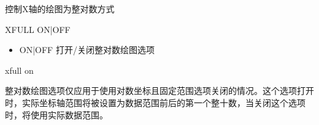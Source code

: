 \label{cmd:xfull}

控制X轴的绘图为整对数方式

\begin{SACSTX}
XFULL ON|OFF
\end{SACSTX}

\begin{itemize}
\item ON|OFF 打开/关闭整对数绘图选项
\end{itemize}

\begin{SACDFT}
xfull on
\end{SACDFT}

整对数绘图选项仅应用于使用对数坐标且固定范围选项关闭的情况。这个选项打开时，实际坐标轴范围将被设置为数据范围前后的第一个整十数，当关闭这个选项时，将使用实际数据范围。

